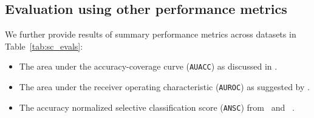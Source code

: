 \subsection{Evaluation using other performance metrics}

We further provide results of summary performance metrics across datasets in Table~\ref{tab:sc_evals}:

\begin{itemize}
    \item The area under the accuracy-coverage curve (\texttt{AUACC}) as discussed in \citet{geifman2018bias}.
    \item The area under the receiver operating characteristic (\texttt{AUROC}) as suggested by \citet{galil2023can}.
    \item The accuracy normalized selective classification score (\texttt{ANSC}) from~\citet{geifman2018bias} and ~\citet{rabanser2023training}.
\end{itemize}

